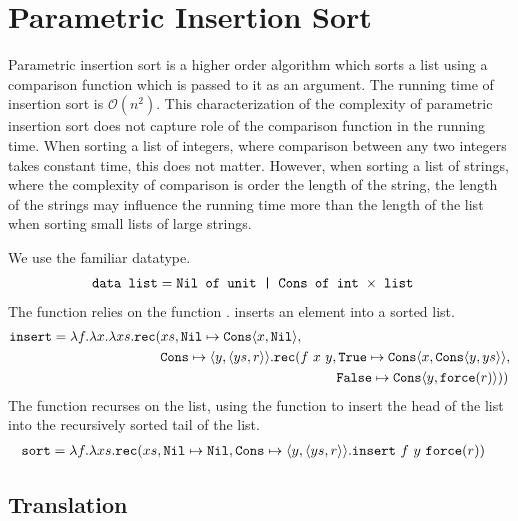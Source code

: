 \chapter{Parametric Insertion Sort}
%
Parametric insertion sort is a higher order algorithm which sorts a list using
a comparison function which is passed to it as an argument.  The running time
of insertion sort is $\mathcal{O}(n^2)$.  This characterization of the
complexity of parametric insertion sort does not capture role of the comparison
function in the running time.  When sorting a list of integers, where
comparison between any two integers takes constant time, this does not matter.
However, when sorting a list of strings, where the complexity of comparison is
order the length of the string, the length of the strings may influence the
running time more than the length of the list when sorting small lists of large
strings.

We use the familiar  datatype.
\begin{align*}
  \texttt{data list} &= \texttt{Nil of unit | Cons of int $\times$ list}
\end{align*}
%
The function  relies on the function .  inserts an
element into a sorted list.
%
\begin{align*}
  \texttt{insert} &= \lambda f.\lambda x.\lambda xs.\texttt{rec}(xs, \texttt{Nil} \mapsto \texttt{Cons} \langle x, \texttt{Nil}\rangle,\\
             &\qquad\quad\quad\quad\quad\quad\quad \texttt{Cons}\mapsto \langle y, \langle ys,r \rangle\rangle.\texttt{rec}(f\ x\ y, \texttt{True}\mapsto \texttt{Cons}\langle x,\texttt{Cons}\langle y,ys \rangle\rangle, \\
             &\qquad\quad\quad\quad\qquad\quad\quad\quad\qquad\quad\quad\quad\qquad\quad\quad\quad\quad \texttt{False}\mapsto \texttt{Cons}\langle y,\texttt{force}(r)\rangle))
\end{align*}
%
The  function recurses on the list, using the  function to
insert the head of the list into the recursively sorted tail of the list.
%
\begin{align*}
  \texttt{sort} &= \lambda f.\lambda xs.\texttt{rec}(xs, \texttt{Nil} \mapsto \texttt{Nil}, \texttt{Cons} \mapsto \langle y,\langle ys,r \rangle\rangle.\texttt{insert}\ f\ y\ \texttt{force}(r))
\end{align*}
%
\section{Translation}
%

